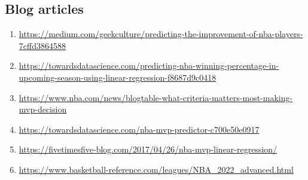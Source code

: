 \documentclass[11pt,a4paper]{article}
\begin{document}
\subsection{Blog articles}
\begin{enumerate}
    \item \url{https://medium.com/geekculture/predicting-the-improvement-of-nba-players-7cffd3864588}
    \item \url{https://towardsdatascience.com/predicting-nba-winning-percentage-in-upcoming-season-using-linear-regression-f8687d9c0418}
    \item \url{https://www.nba.com/news/blogtable-what-criteria-matters-most-making-mvp-decision}
    \item \url{https://towardsdatascience.com/nba-mvp-predictor-c700e50e0917}
    \item \url{https://fivetimesfive-blog.com/2017/04/26/nba-mvp-linear-regression/}
    \item \url{https://www.basketball-reference.com/leagues/NBA_2022_advanced.html}
\end{enumerate}
\end{document}
